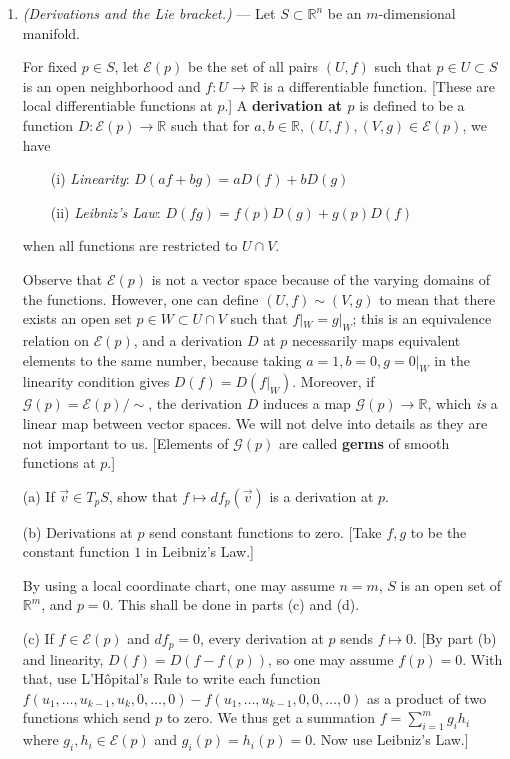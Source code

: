 \documentclass[leqno]{book}
\begin{document}
\begin{enumerate}
\item\emph{(Derivations and the Lie bracket.)} \---- Let $S\subset\mathbb R^n$ be an $m$-dimensional manifold. %

For fixed $p\in S$, let $\mathcal E(p)$ be the set of all pairs $(U,f)$ such that $p\in U\subset S$ is an open neighborhood and $f:U\to\mathbb R$ is a differentiable function.  [These are local differentiable functions at $p$.]  A \textbf{derivation at $p$} is defined to be a function $D:\mathcal E(p)\to\mathbb R$ such that for $a,b\in\mathbb R,(U,f),(V,g)\in\mathcal E(p)$, we have

~~~~(i) \emph{Linearity}: $D(af+bg)=aD(f)+bD(g)$

~~~~(ii) \emph{Leibniz's Law}: $D(fg)=f(p)D(g)+g(p)D(f)$

when all functions are restricted to $U\cap V$.

Observe that $\mathcal E(p)$ is not a vector space because of the varying domains of the functions.  However, one can define $(U,f)\sim(V,g)$ to mean that there exists an open set $p\in W\subset U\cap V$ such that $f|_W=g|_W$; this is an equivalence relation on $\mathcal E(p)$, and a derivation $D$ at $p$ necessarily maps equivalent elements to the same number, because taking $a=1,b=0,g=0|_W$ in the linearity condition gives $D(f)=D(f|_W)$. %
Moreover, if $\mathcal G(p)=\mathcal E(p)/\sim$, the derivation $D$ induces a map $\mathcal G(p)\to\mathbb R$, which \emph{is} a linear map between vector spaces.  We will not delve into details as they are not important to us.  [Elements of $\mathcal G(p)$ are called \textbf{germs} of smooth functions at $p$.]

(a) If $\vec v\in T_pS$, show that $f\mapsto df_p(\vec v)$ is a derivation at $p$.

(b) Derivations at $p$ send constant functions to zero.  [Take $f,g$ to be the constant function $1$ in Leibniz's Law.]

By using a local coordinate chart, one may assume $n=m$, $S$ is an open set of $\mathbb R^m$, and $p=0$.  This shall be done in parts (c) and (d).

(c) If $f\in\mathcal E(p)$ and $df_p=0$, every derivation at $p$ sends $f\mapsto 0$.  [By part (b) and linearity, $D(f)=D(f-f(p))$, so one may assume $f(p)=0$.  With that, use L'H\^opital's Rule to write each function $f(u_1,\dots,u_{k-1},u_k,0,\dots,0)-f(u_1,\dots,u_{k-1},0,0,\dots,0)$ as a product of two functions which send $p$ to zero.  We thus get a summation $f=\sum_{i=1}^mg_ih_i$ where $g_i,h_i\in\mathcal E(p)$ and $g_i(p)=h_i(p)=0$.  Now use Leibniz's Law.]


\end{enumerate}
\end{document}

